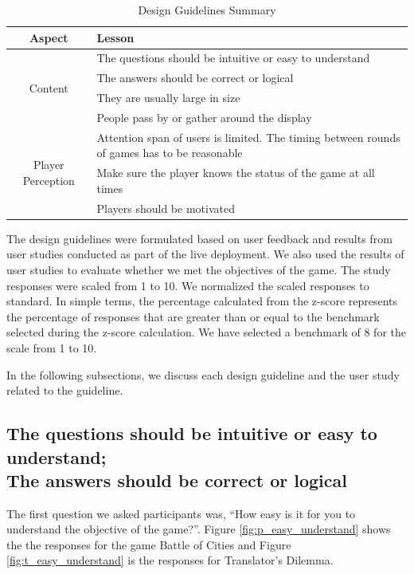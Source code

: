 \documentclass{sig-alternate}
\begin{document}
\begin{table}[ht]
	\label{table:design_guidlines_summary}
	\begin{tabular*}{1\textwidth}{c | l}
 		\hline
		Aspect & Lesson\\ \hline
  		\multirow{4}{*}{Content} & The questions should be intuitive or easy to understand\\
 			& The answers should be correct or logical\\
 			& They are usually large in size\\
 			& People pass by or gather around the display\\ \hline
		\multirow{4}{*}{Player Perception} & Attention span of users is limited. The timing between rounds of games has to be reasonable
\\
 			& Make sure the player knows the status of the game at all times\\
 			& Players should be motivated\\ \hline	
	\end{tabular*}
	\caption{Design Guidelines Summary}
\end{table}

The design guidelines were formulated based on user feedback and results from user studies conducted as part of the live deployment. We also used the results of user studies to evaluate whether we met the objectives of the game. The study responses were scaled from 1 to 10. We normalized the scaled responses to standard\cite{laerd:standard_score}. In simple terms, the percentage calculated from the z-score represents the percentage of responses that are greater than or equal to the benchmark selected during the z-score calculation. We have selected a benchmark of 8 for the scale from 1 to 10.

In the following subsections, we discuss each design guideline and the user study related to the guideline.

\subsection{The questions should be intuitive or easy to understand;\\
The answers should be correct or logical}

The first question we asked participants was, ``How easy is it for you to understand the objective of the game?''. 
Figure \ref{fig:p_easy_understand} shows the the responses for the game Battle of Cities and Figure \ref{fig:t_easy_understand} is the responses for Translator's Dilemma. 
\end{document}
